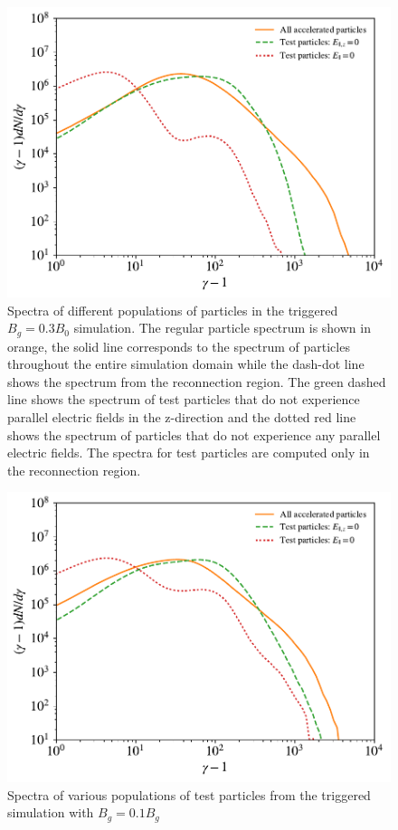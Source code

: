 \documentclass[iop,twocolappendix]{emulateapj}
\begin{document}
\begin{figure}[htp] 
\includegraphics[width=\linewidth]{bguide3_testspec.pdf}
\caption{Spectra of different populations of particles in the triggered $B_{g}=0.3B_{0}$ simulation.  The regular particle spectrum is shown in orange, the solid line corresponds to the spectrum of particles throughout the entire simulation domain while the dash-dot line shows the spectrum from the reconnection region.  The green dashed line shows the spectrum of test particles that do not experience parallel electric fields in the z-direction and the dotted red line shows the spectrum of particles that do not experience any parallel electric fields.  The spectra for test particles are computed only in the reconnection region.}
\label{testprtl_spec}
\end{figure}

\begin{figure}[htp] 
	\includegraphics[width=\linewidth]{bguide1_testspec.pdf}
	\caption{Spectra of various populations of test particles from the triggered simulation with $B_{g}=0.1B_{g}$}

	\label{bguide1_testprtl_spec}
\end{figure}
\end{document}
